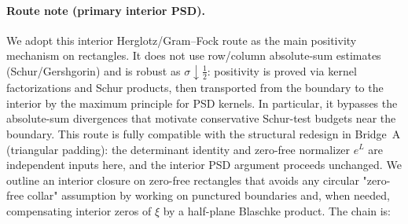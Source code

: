 \documentclass[11pt]{article}
\theoremstyle{definition}
\theoremstyle{remark}
\begin{document}
\paragraph{Route note (primary interior PSD).}
We adopt this interior Herglotz/Gram--Fock route as the main positivity mechanism on rectangles. It does not use row/column absolute-sum estimates (Schur/Gershgorin) and is robust as $\sigma\downarrow\tfrac12$: positivity is proved via kernel factorizations and Schur products, then transported from the boundary to the interior by the maximum principle for PSD kernels. In particular, it bypasses the absolute-sum divergences that motivate conservative Schur-test budgets near the boundary. This route is fully compatible with the structural redesign in Bridge~A (triangular padding): the determinant identity and zero-free normalizer $e^{L}$ are independent inputs here, and the interior PSD argument proceeds unchanged.
We outline an interior closure on zero-free rectangles that avoids any circular "zero-free collar" assumption by working on punctured boundaries and, when needed, compensating interior zeros of \(\xi\) by a half-plane Blaschke product. The chain is:
\end{document}
